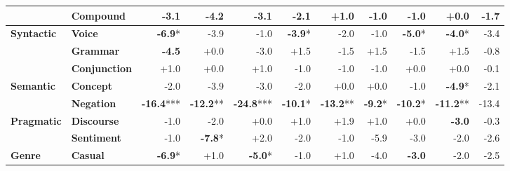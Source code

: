 \begin{table}[h]
{\begin{tabular}{llrrrrrrrrr}
  & \textbf{Compound} & \cellcolor{red!6} \textbf{-3.1} & \cellcolor{red!8} -4.2 & \cellcolor{red!6} \textbf{-3.1} & \cellcolor{red!4} -2.1 & \cellcolor{green!2} +1.0 & \cellcolor{red!2} -1.0 & \cellcolor{red!2} -1.0 & \cellcolor{red!0} +0.0 & -1.7 \\
\midrule
\textbf{Syntactic} & \textbf{Voice} & \cellcolor{red!13} \textbf{-6.9}* & \cellcolor{red!7} -3.9 & \cellcolor{red!1} -1.0 & \cellcolor{red!7} \textbf{-3.9}* & \cellcolor{red!3} -2.0 & \cellcolor{red!1} -1.0 & \cellcolor{red!9} \textbf{-5.0}* & \cellcolor{red!7} \textbf{-4.0}* & -3.4 \\
  & \textbf{Grammar} & \cellcolor{red!8} \textbf{-4.5} & \cellcolor{red!0} +0.0 & \cellcolor{red!5} -3.0 & \cellcolor{green!2} +1.5 & \cellcolor{red!2} -1.5 & \cellcolor{green!2} +1.5 & \cellcolor{red!2} -1.5 & \cellcolor{green!2} +1.5 & -0.8 \\
  & \textbf{Conjunction} & \cellcolor{green!1} +1.0 & \cellcolor{red!0} +0.0 & \cellcolor{green!1} +1.0 & \cellcolor{red!1} -1.0 & \cellcolor{red!1} -1.0 & \cellcolor{red!1} -1.0 & \cellcolor{red!0} +0.0 & \cellcolor{red!0} +0.0 & -0.1 \\
\midrule
\textbf{Semantic} & \textbf{Concept} & \cellcolor{red!3} -2.0 & \cellcolor{red!7} -3.9 & \cellcolor{red!5} -3.0 & \cellcolor{red!3} -2.0 & \cellcolor{red!0} +0.0 & \cellcolor{red!0} +0.0 & \cellcolor{red!1} -1.0 & \cellcolor{red!9} \textbf{-4.9}* & -2.1 \\
  & \textbf{Negation} & \cellcolor{red!20} \textbf{-16.4}*** & \cellcolor{red!20} \textbf{-12.2}** & \cellcolor{red!20} \textbf{-24.8}*** & \cellcolor{red!20} \textbf{-10.1}* & \cellcolor{red!20} \textbf{-13.2}** & \cellcolor{red!18} \textbf{-9.2}* & \cellcolor{red!20} \textbf{-10.2}* & \cellcolor{red!20} \textbf{-11.2}** & -13.4 \\
\midrule
\textbf{Pragmatic} & \textbf{Discourse} & \cellcolor{red!1} -1.0 & \cellcolor{red!3} -2.0 & \cellcolor{red!0} +0.0 & \cellcolor{green!1} +1.0 & \cellcolor{green!3} +1.9 & \cellcolor{green!1} +1.0 & \cellcolor{red!0} +0.0 & \cellcolor{red!5} \textbf{-3.0} & -0.3 \\
  & \textbf{Sentiment} & \cellcolor{red!1} -1.0 & \cellcolor{red!15} \textbf{-7.8}* & \cellcolor{green!3} +2.0 & \cellcolor{red!3} -2.0 & \cellcolor{red!1} -1.0 & \cellcolor{red!11} -5.9 & \cellcolor{red!5} -3.0 & \cellcolor{red!3} -2.0 & -2.6 \\
\midrule
\textbf{Genre} & \textbf{Casual} & \cellcolor{red!13} \textbf{-6.9}* & \cellcolor{green!1} +1.0 & \cellcolor{red!9} \textbf{-5.0}* & \cellcolor{red!1} -1.0 & \cellcolor{green!1} +1.0 & \cellcolor{red!7} -4.0 & \cellcolor{red!5} \textbf{-3.0} & \cellcolor{red!3} -2.0 & -2.5 \\

\end{tabular}}
\end{table}
